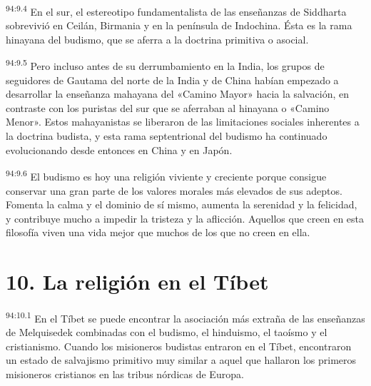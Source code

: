 \par
\textsuperscript{94:9.4} En el sur, el estereotipo fundamentalista de las enseñanzas de Siddharta sobrevivió en Ceilán, Birmania y en la península de Indochina. Ésta es la rama hinayana del budismo, que se aferra a la doctrina primitiva o asocial.

\par
\textsuperscript{94:9.5} Pero incluso antes de su derrumbamiento en la India, los grupos de seguidores de Gautama del norte de la India y de China habían empezado a desarrollar la enseñanza mahayana del «Camino Mayor» hacia la salvación, en contraste con los puristas del sur que se aferraban al hinayana o «Camino Menor». Estos mahayanistas se liberaron de las limitaciones sociales inherentes a la doctrina budista, y esta rama septentrional del budismo ha continuado evolucionando desde entonces en China y en Japón.

\par
\textsuperscript{94:9.6} El budismo es hoy una religión viviente y creciente porque consigue conservar una gran parte de los valores morales más elevados de sus adeptos. Fomenta la calma y el dominio de sí mismo, aumenta la serenidad y la felicidad, y contribuye mucho a impedir la tristeza y la aflicción. Aquellos que creen en esta filosofía viven una vida mejor que muchos de los que no creen en ella.

\section*{10. La religión en el Tíbet}
\par
\textsuperscript{94:10.1} En el Tíbet se puede encontrar la asociación más extraña de las enseñanzas de Melquisedek combinadas con el budismo, el hinduismo, el taoísmo y el cristianismo. Cuando los misioneros budistas entraron en el Tíbet, encontraron un estado de salvajismo primitivo muy similar a aquel que hallaron los primeros misioneros cristianos en las tribus nórdicas de Europa.

